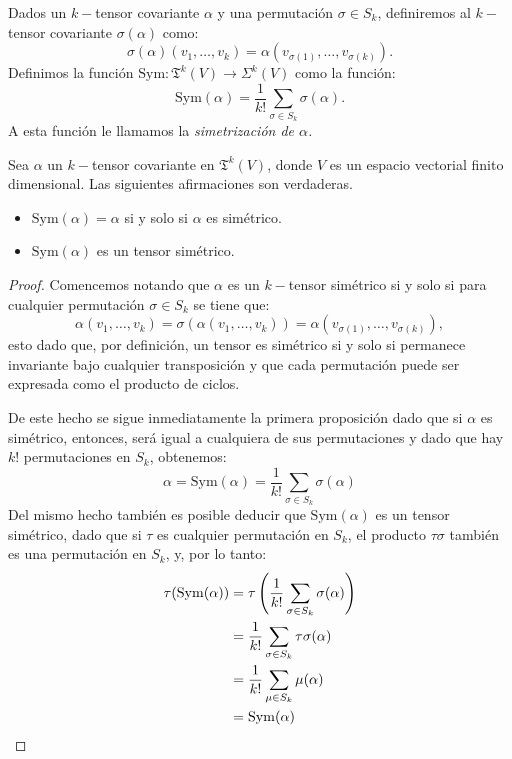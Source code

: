 \begin{definition}
	Dados un $k-$tensor covariante $\alpha$ y una permutación $\sigma \in S_{k}$,
	definiremos al $k-$tensor covariante $\sigma(\alpha)$ como:
	\[
		\sigma(\alpha)(v_1,\ldots,v_k) = \alpha(v_{\sigma(1)},\ldots,v_{\sigma(k)}).
	\]
	Definimos la función $\mathrm{Sym}: \mathfrak{T}^k(V) \to \Sigma^{k}(V)$ como
	la función:
	\[
		\mathrm{Sym}(\alpha) = \frac{1}{k!} \sum_{\sigma \in S_{k}} \sigma(\alpha).
	\]
	A esta función le llamamos la \it{simetrización} de $\alpha$.
\end{definition}

\begin{lemma}
	Sea $\alpha$ un $k-$tensor covariante en $\mathfrak{T}^{k}(V)$, donde $V$ es un
	espacio vectorial finito dimensional. Las siguientes afirmaciones son
	verdaderas.
	\begin{itemize}
		\item $\mathrm{Sym}(\alpha) = \alpha$ si y solo si $\alpha$ es simétrico.
		\item $\mathrm{Sym}(\alpha)$ es un tensor simétrico.
	\end{itemize}
\end{lemma}

\begin{proof}
	Comencemos notando que $\alpha$ es un $k-$tensor simétrico si y solo si
	para cualquier permutación $\sigma \in S_{k}$ se tiene que:
	\[
		\alpha(v_1, \ldots, v_k) = \sigma (\alpha(v_1, \ldots, v_k)) =
		\alpha(v_{\sigma(1)}, \ldots, v_{\sigma(k)}),
	\]
	esto dado que, por definición, un tensor es simétrico si y solo si permanece
	invariante bajo cualquier transposición y que cada permutación puede ser
	expresada como el producto de ciclos.

	De este hecho se sigue inmediatamente la primera proposición dado
	que si $\alpha$ es simétrico, entonces, será igual a cualquiera de sus
	permutaciones y dado que hay $k!$	permutaciones en $S_k$, obtenemos:
	\[
		\alpha = \mathrm{Sym}(\alpha) = \frac{1}{k!} \sum_{\sigma \in
			S_{k}} \sigma(\alpha)
	\]
	Del mismo hecho también es posible deducir que $\mathrm{Sym}(\alpha)$ es un
	tensor simétrico, dado que si $\tau$ es cualquier permutación en
	$S_{k}$, el producto $\tau \sigma$ también es una permutación en
	$S_k$, y, por lo tanto:
	\begin{align*}
		\tau(\mathrm{Sym}(\alpha))
		 & = \tau \left( \frac{1}{k!} \sum_{\sigma\in S_k} \sigma(\alpha) \right) \\
		 & = \frac{1}{k!} \sum_{\sigma \in S_k} \tau\sigma(\alpha)         \\
		 & = \frac{1}{k!} \sum_{\mu \in S_k} \mu(\alpha)                   \\
		 & = \mathrm{Sym}(\alpha)
	\end{align*}
\end{proof}


